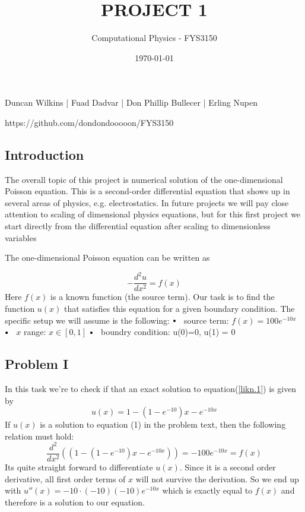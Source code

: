 \documentclass{article}
\title{\Huge{ PROJECT 1 }}
\author{Computational Physics - FYS3150}
\date{\today}
\newcommand\sbullet[1][.5]{\mathbin{\vcenter{\hbox{\scalebox{#1}{$\bullet$}}}}}
\begin{document}
\maketitle
\centerline{Duncan Wilkins | Fuad Dadvar | Don Phillip Bullecer | Erling Nupen}
\centerline{https://github.com/dondondooooon/FYS3150}
\subsection*{Introduction}
The overall topic of this project is numerical solution of the one-dimensional Poisson equation. This is a second-order differential equation that shows up in several areas of physics, e.g. electrostatics. In future projects we will pay close attention to scaling of dimensional physics equations, but for this first project we start directly from the differential equation after scaling to dimensionless variables
\vskip 0.01in
\begin{flushleft}
The one-dimensional Poisson equation can be written as

\end{flushleft}
\begin{equation}\label{likn.1}
    -\frac{d^2u}{dx^2} = f(x)
\end{equation}
Here $f(x)$ is a known function (the source term). Our task is to find the function $u(x)$ that satisfies this equation for a given boundary condition. The specific setup we will assume is the following:
\vskip 0.1in
$\sbullet[.75]\hspace{0.2cm}$ source term: $f(x) = 100e^{-10x}$
\vskip 0.1in
$\sbullet[.75]\hspace{0.2cm}$ $x$ range: $x\in [0,1]$
\vskip0.1in
$\sbullet[.75]\hspace{0.2cm}$ boundry condition: u(0)=0, u(1) = 0
\subsection*{Problem I}
In this task we're to check if that an exact solution to equation(\ref{likn.1}) is given by
\begin{equation}\label{likn.2}
    u(x) = 1 - (1-e^{-10})x-e^{-10x}
\end{equation}
If $u(x)$ is a solution to equation (1) in the problem text, then the following relation must hold:
\begin{equation}\label{likn3}
    \frac{d^2}{dx^2}((1-(1-e^{-10})x - e^{-10x})) = -100e^{-10x} = f(x)
\end{equation}
Its quite straight forward to differentiate $u(x)$. Since it is a second order derivative, all first order terms of $x$ will not survive the derivation. So we end up with $u''(x) = - 10 \cdot (-10)(-10) e^{-10x}$ which is exactly equal to $f(x)$ and therefore is a solution to our equation.
\end{document}
